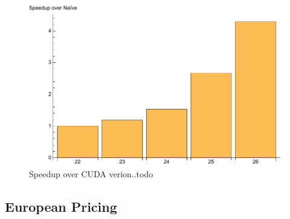 \begin{figure}
\centering
\includegraphics[scale=0.5]{data/blackscholes.pdf}
\caption{Speedup over CUDA verion..todo}
\label{fig:blackscholes}
\centering
\end{figure}


\subsection{European Pricing}

